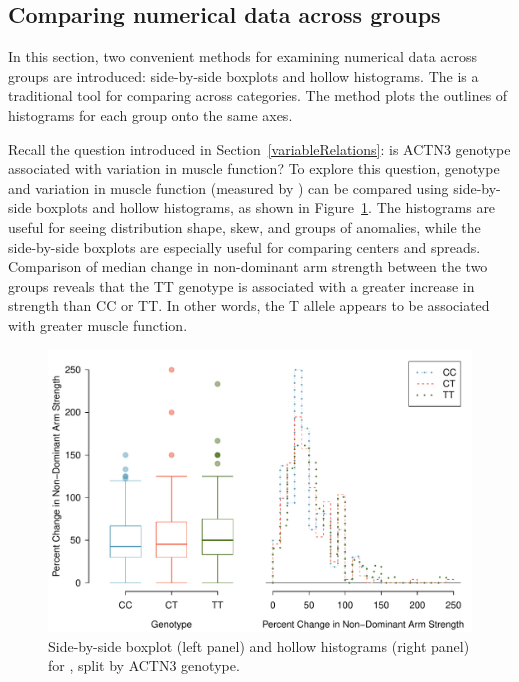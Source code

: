 \newpage
\subsection{Comparing numerical data across groups}
\label{comparingAcrossGroups}
In this section, two convenient methods for examining numerical data across groups are introduced: side-by-side boxplots and hollow histograms. The   is a traditional tool for comparing across categories. The  method plots the outlines of histograms for each group onto the same axes.

Recall the question introduced in Section~\ref{variableRelations}: is ACTN3 genotype associated with variation in muscle function? To explore this question, genotype and variation in muscle function (measured by ) can be compared using side-by-side boxplots and hollow histograms, as shown in Figure~\ref{famussGenoMuscFunc}. The histograms are useful for seeing distribution shape, skew, and groups of anomalies, while the side-by-side boxplots are especially useful for comparing centers and spreads. Comparison of median change in non-dominant arm strength between the two groups reveals that the TT genotype is associated with a greater increase in strength than CC or TT. In other words, the T allele appears to be associated with greater muscle function.

\begin{figure}[h]
   \centering
   \includegraphics[width=\textwidth]{ch_intro_to_data_oi_biostat/figures/famussGenoMuscFunc/famussGenoMuscFunc}
   \caption{Side-by-side boxplot (left panel) and hollow histograms (right panel) for , split by ACTN3 genotype.}
   \label{famussGenoMuscFunc}
\end{figure}

